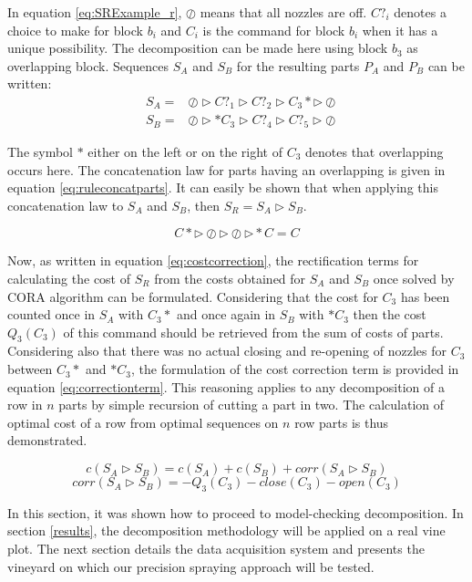 In equation \ref{eq:SRExample_r}, $\oslash$ means that all nozzles are off. $C?_{i}$ denotes a choice to make for block $b_i$ and $C_{i}$ is the command for block $b_{i}$ when it has a unique possibility. The decomposition can be made here using block $b_3$ as overlapping block.  Sequences $S_A$ and $S_B$ for the resulting parts $P_A$ and $P_B$ can be written:
\begin{eqnarray}
	&S_A =& \oslash \triangleright C?_1 \triangleright C?_2 \triangleright C_{3}* \triangleright \oslash \label{eq:SAExample_r}
	\\
	&S_B =& \oslash \triangleright *C_{3} \triangleright C?_4 \triangleright C?_5 \triangleright \oslash \label{eq:SBExample_r}
\end{eqnarray}

The symbol $*$ either on the left or on the right of $C_3$ denotes that overlapping occurs here. The concatenation law for parts having an overlapping is given in equation \ref{eq:ruleconcatparts}. It can easily be shown that when applying this concatenation law to $S_A$ and $S_B$, then $S_R = S_A \triangleright S_B$.

\begin{equation}
	C* \triangleright \oslash \triangleright \oslash \triangleright *C = C \label{eq:ruleconcatparts}
\end{equation}

Now, as written in equation \ref{eq:costcorrection}, the rectification terms for calculating the cost of $S_R$ from the costs obtained for $S_A$ and $S_B$ once solved by CORA algorithm can be formulated. Considering that the cost for $C_3$ has been counted once in $S_A$ with $C_3 *$ and once again in $S_B$ with $*C_3$ then the cost $Q_{3}(C_{3})$ of this command should be retrieved from the sum of costs of parts. Considering also that there was no actual closing and re-opening of nozzles for $C_3$ between $C_3 *$ and $*C_3$, the formulation of the cost correction term is provided in equation \ref{eq:correctionterm}. This reasoning applies to any decomposition of a row in $n$ parts by simple recursion of cutting a part in two. The calculation of optimal cost of a row from optimal sequences on $n$ row parts is thus demonstrated.

\begin{equation}
	c(S_A \triangleright S_B)=c(S_A)+c(S_B)+corr(S_A \triangleright S_B) \label{eq:costcorrection}
\end{equation}
\begin{equation}
	corr(S_A \triangleright S_B)= - Q_{3}(C_{3}) - close(C_{3}) - open(C_{3}) \label{eq:correctionterm}
\end{equation}

In this section, it was shown how to proceed to model-checking decomposition.
In section \ref{results}, the decomposition methodology will be applied on a real vine plot. The next section details the data acquisition system and presents the vineyard on which our precision spraying approach will be tested.


